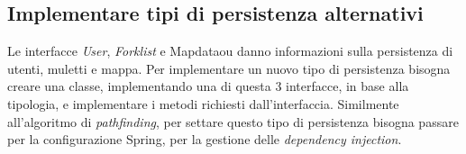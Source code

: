 \subsection{Implementare tipi di persistenza alternativi}
Le interfacce \textit{User}, \textit{Forklist} e Mapdataou danno informazioni sulla persistenza di utenti, muletti e mappa. Per implementare un nuovo tipo di persistenza bisogna creare una classe, implementando una di questa 3 interfacce, in base alla tipologia, e implementare i metodi richiesti dall'interfaccia.
Similmente all'algoritmo di \textit{pathfinding}, per settare questo tipo di persistenza bisogna passare per la configurazione Spring, per la gestione delle \textit{dependency injection}.
